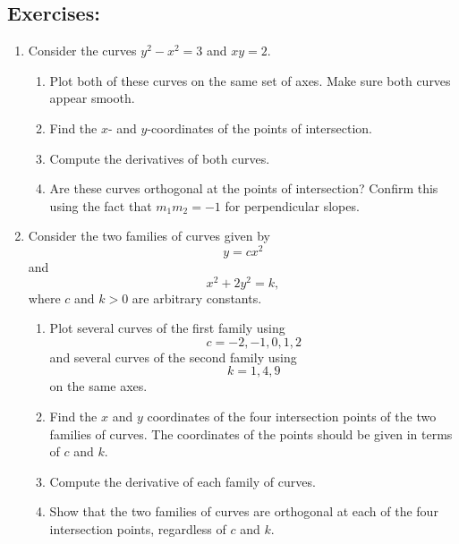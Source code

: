 \subsection*{Exercises:}

\begin{enumerate}
    \item Consider the curves $y^2 - x^2 = 3$ and $xy = 2$.
    \begin{enumerate}
    	\item Plot both of these curves on the same set of axes. Make sure both curves appear smooth.
    	\item Find the $x$- and $y$-coordinates of the points of intersection.
    	\item Compute the derivatives of both curves.
    	\item Are these curves orthogonal at the points of intersection? Confirm this using the fact that $m_1 m_2 = -1$ for perpendicular slopes.
    \end{enumerate}
    \vspace{0.8cm}
    \item Consider the two families of curves given by \[ y = cx^2 \] and \[ x^2 + 2y^2 = k, \] where $c$ and $k > 0$ are arbitrary constants. 
    \begin{enumerate}
    	\item Plot several curves of the first family using 
    	\[ c=-2,-1,0,1,2 \] 
    	and several curves of the second family using
    	\[ k=1,4,9 \]
    	on the same axes.
    	\item Find the $x$ and $y$ coordinates of the four intersection points of the two families of curves. The coordinates of the points should be given in terms of $c$ and $k$.
    	\item Compute the derivative of each family of curves. 
    	\item Show that the two families of curves are orthogonal at each of the four intersection points, regardless of $c$ and $k$.
    \end{enumerate}
\end{enumerate}